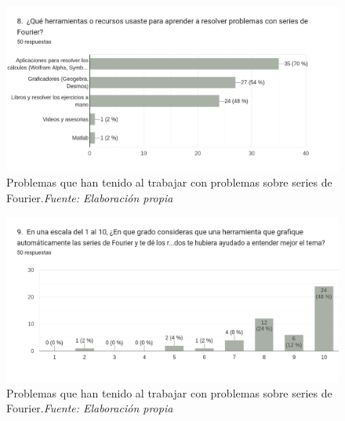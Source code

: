 \begin{figure}[H]
	\centering
	\includegraphics[width=1\textwidth]{img/appendixA/8_herramientas_para_Fourier.png}
	\caption[Problemas que han tenido al trabajar con problemas sobre series de Fourier.]{Problemas que han tenido al trabajar con problemas sobre series de Fourier.\textit{Fuente: Elaboración propia}}
	\label{fig:app1_herramientas_para_Fourier}  %
\end{figure}

\begin{figure}[H]
	\centering
	\includegraphics[width=1\textwidth]{img/appendixA/9_grado_de_ayuda_Fourier.png}
	\caption[Problemas que han tenido al trabajar con problemas sobre series de Fourier.]{Problemas que han tenido al trabajar con problemas sobre series de Fourier.\textit{Fuente: Elaboración propia}}
	\label{fig:app1_grado_de_ayuda_Fourier}  %
\end{figure}

